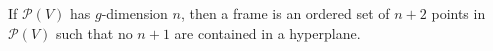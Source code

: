 If $\mathcal{P}(V)$ has $g$-dimension $n$, then a frame is an ordered set of $n+2$ points in $\mathcal{P}(V)$ such that no $n+1$ are contained in a hyperplane.
